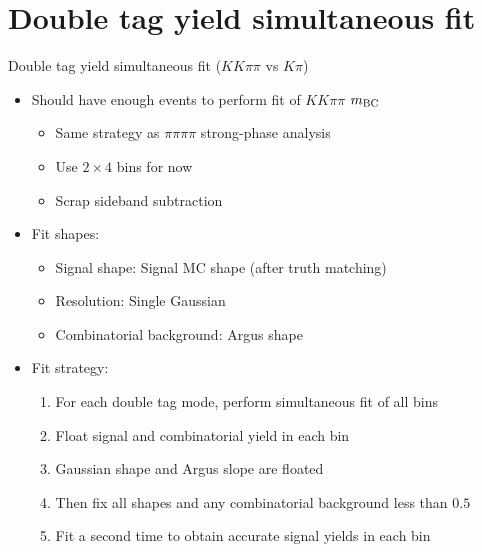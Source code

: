 \documentclass{beamer}
\begin{document}
\section{Double tag yield simultaneous fit}
\begin{frame}{Double tag yield simultaneous fit ($KK\pi\pi$ vs $K\pi$)}
  \begin{itemize}
    \setlength\itemsep{1.5em}
    \item{Should have enough events to perform fit of $KK\pi\pi$ $m_{\rm BC}$}
    \begin{itemize}
      \item{Same strategy as $\pi\pi\pi\pi$ strong-phase analysis}
      \item{Use $2\times 4$ bins for now}
      \item{Scrap sideband subtraction}
    \end{itemize}
    \item{Fit shapes:}
    \begin{itemize}
      \item{Signal shape: Signal MC shape (after truth matching)}
      \item{Resolution: Single Gaussian}
      \item{Combinatorial background: Argus shape}
    \end{itemize}
    \item{Fit strategy:}
    \begin{enumerate}
      \item{For each double tag mode, perform simultaneous fit of all bins}
      \item{Float signal and combinatorial yield in each bin}
      \item{Gaussian shape and Argus slope are floated}
      \item{Then fix all shapes and any combinatorial background less than $0.5$}
      \item{Fit a second time to obtain accurate signal yields in each bin}
    \end{enumerate}
  \end{itemize}
\end{frame}
\end{document}
